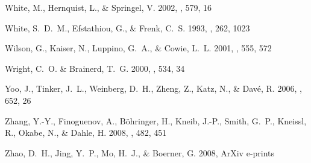 \documentclass[12pt]{emulateapj}
\begin{document}
\begin{thebibliography}{111}
{White}, M., {Hernquist}, L., \& {Springel}, V. 2002, \apj, 579, 16

{White}, S.~D.~M., {Efstathiou}, G., \& {Frenk}, C.~S. 1993, \mnras, 262, 1023

{Wilson}, G., {Kaiser}, N., {Luppino}, G.~A., \& {Cowie}, L.~L. 2001, \apj,
  555, 572

{Wright}, C.~O. \& {Brainerd}, T.~G. 2000, \apj, 534, 34

{Yoo}, J., {Tinker}, J.~L., {Weinberg}, D.~H., {Zheng}, Z., {Katz}, N., \&
  {Dav{\'e}}, R. 2006, \apj, 652, 26

{Zhang}, Y.-Y., {Finoguenov}, A., {B{\"o}hringer}, H., {Kneib}, J.-P., {Smith},
  G.~P., {Kneissl}, R., {Okabe}, N., \& {Dahle}, H. 2008, \aap, 482, 451

{Zhao}, D.~H., {Jing}, Y.~P., {Mo}, H.~J., \& {Boerner}, G. 2008, ArXiv
  e-prints

\end{thebibliography}

\end{document}
